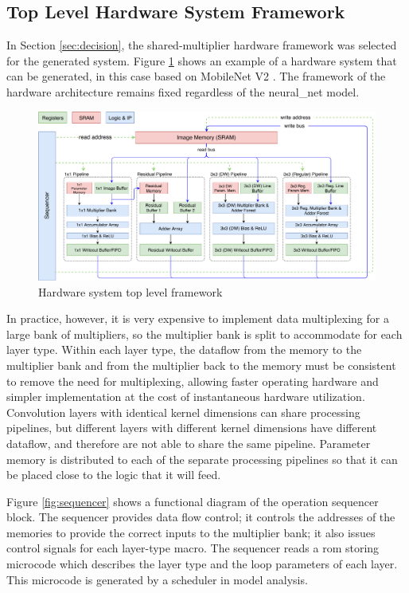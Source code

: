\documentclass{uw-ece-wkrpt}
\begin{document}
\subsection{Top Level Hardware System Framework}\label{sec:top_level_framework}

In Section \ref{sec:decision}, the shared-multiplier hardware framework was selected for the generated system. Figure \ref{fig:top_level} shows an example of a hardware system that can be generated, in this case based on MobileNet V2 \cite{Howard2017MobileNets:-Eff}. The framework of the hardware architecture remains fixed regardless of the \gls{neural_net} model.

\begin{figure}
\centering
\includegraphics[width=\textwidth]{figures/top_level}
\caption{Hardware system top level framework}\label{fig:top_level}
\end{figure}

In practice, however, it is very expensive to implement data multiplexing for a large bank of multipliers, so the multiplier bank is split to accommodate for each layer type. Within each layer type, the dataflow from the memory to the multiplier bank and from the multiplier back to the memory must be consistent to remove the need for multiplexing, allowing faster operating hardware and simpler implementation at the cost of instantaneous hardware utilization. Convolution layers with identical \gls{kernel} dimensions can share processing pipelines, but different layers with different \gls{kernel} dimensions have different dataflow, and therefore are not able to share the same pipeline. Parameter memory is distributed to each of the separate processing pipelines so that it can be placed close to the logic that it will feed.

Figure \ref{fig:sequencer} shows a functional diagram of the operation sequencer block. The sequencer provides data flow control; it controls the addresses of the memories to provide the correct inputs to the multiplier bank; it also issues control signals for each layer-type macro. The sequencer reads a \gls{rom} storing microcode which describes the layer type and the loop parameters of each layer. This microcode is generated by a scheduler in model analysis.
\end{document}
